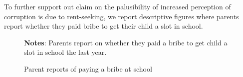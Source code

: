 \documentclass[hidelinks,12pt]{article}
\begin{document}
\begin{singlespace}
To further support out claim on the palusibility of increased perception of corruption is due to rent-seeking, we report descriptive figures where parents report whether they paid bribe to get their child a slot in school. 

\begin{singlespace}
\begin{figure}[H]
\centering
\caption{Parent reports of paying a bribe at school}\label{fig:paid_bribe_sch_yr}
\begin{minipage}{0.55\linewidth}
\vspace{3pt}
\footnotesize{\justify\textbf{Notes}: Parents report on whether they paid a bribe to get child a slot in school the last year.}
\end{minipage}
\end{figure}
\end{singlespace}


\end{singlespace}

\newpage

\singlespacing


\printbibliography[title={References}] \pagebreak 
\end{document}
